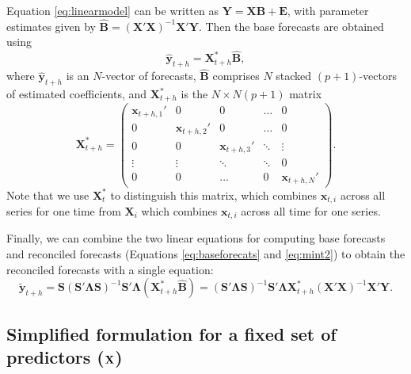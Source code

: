 \documentclass[11pt,a4paper,]{article}
\begin{document}
Equation \eqref{eq:linearmodel} can be written as
\(\bm{Y} = \bm{X} \bm{B} + \bm{E}\), with parameter estimates given by
\(\hat{\bm{B}} = (\bm{X}'\bm{X})^{-1} \bm{X}'\bm{Y}\). Then the base
forecasts are obtained using \begin{equation}\label{eq:baseforecats}
\hat{\bm{y}}_{t+h} = \bm{X}_{t+h}^* \hat{\bm{B}},
\end{equation} where \(\hat{\bm{y}}_{t+h}\) is an \(N\)-vector of
forecasts, \(\hat{\bm{B}}\) comprises \(N\) stacked \((p+1)\)-vectors of
estimated coefficients, and \(\bm{X}_{t+h}^*\) is the \(N\times N(p+1)\)
matrix \pagebreak[3]\begin{equation}
\bm{X}_{t+h}^* =
\begin{pmatrix}
\bm{x}_{t+h,1}' & 0                & 0                & \dots  & 0\\
0               & \bm{x}_{t+h,2}' & 0                & \dots  & 0\\
0               & 0                & \bm{x}_{t+h,3}' & \ddots & \vdots \\
\vdots          & \vdots           & \ddots           & \ddots & 0\\
0               & 0                & \dots            & 0      & \bm{x}_{t+h,N}'
\end{pmatrix}.
\end{equation} Note that we use \(\bm{X}^*_{t}\) to distinguish this
matrix, which combines \(\bm{x}_{t,i}\) across all series for one time
from \(\bm{X}_i\) which combines \(\bm{x}_{t,i}\) across all time for
one series.

Finally, we can combine the two linear equations for computing base
forecasts and reconciled forecasts (Equations \eqref{eq:baseforecats} and
\eqref{eq:mint2}) to obtain the reconciled forecasts with a single
equation: \begin{equation}\label{eq:singlestep}
\tilde{\bm{y}}_{t+h} = \bm{S}(\bm{S}'\bm{\Lambda}\bm{S})^{-1}\bm{S}'\bm{\Lambda}
                        (\bm{X}_{t+h}^* \hat{\bm{B}})
                        = (\bm{S}'\bm{\Lambda}\bm{S})^{-1}\bm{S}'\bm{\Lambda}
                        \bm{X}_{t+h}^* (\bm{X}'\bm{X})^{-1} \bm{X}'\bm{Y}.
\end{equation}

\hypertarget{simplified-formulation-for-a-fixed-set-of-predictors-bf-x}{%
\subsection{\texorpdfstring{Simplified formulation for a fixed set of
predictors (\(\bf {X}\))
\label{sec:proposedapproach2}}{Simplified formulation for a fixed set of predictors (\textbackslash{}bf \{X\}) }}\label{simplified-formulation-for-a-fixed-set-of-predictors-bf-x}}
\end{document}
